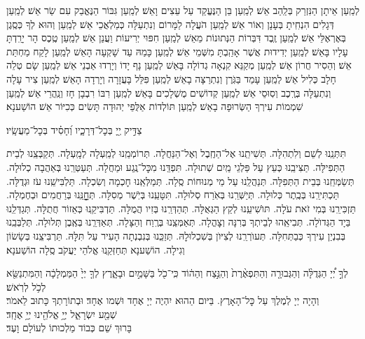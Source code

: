 \documentclass[twoside, openany, parskip=half, 11pt]{book}
\begin{document}
לְמַֽעַן אֵיתָן הַנִּזְרַק בְּלַֽהַב אֵשׁ׃ לְמַֽעַן בֵּן הַנֶּעֱקַד עַל עֵצִים וָאֵשׁ׃ לְמַֽעַן גִּבּוֹר הַנֶּאֱבַק עִם שַׂר אֵשׁ׃ לְמַֽעַן דְּגָלִים הִנְחִֽיתָ בְּעָנָן וְאוֹר אֵשׁ׃ לְמַֽעַן הֹעֲלָה לַמָּרוֹם וְנִתְעַלָּה כְּמַלְאֲכֵי אֵשׁ׃ לְמַֽעַן וְהוּא לְךָ כְּסֶֽגֶן בְּאֶרְאֶלֵּי אֵשׁ׃ לְמַֽעַן זֶֽבֶד דִּבְּרוֹת הַנְּתוּנוֹת מֵאֵשׁ לְמַֽעַן חִפּוּי יְרִיעוֹת וַעֲנַן אֵשׁ׃ לְמַֽעַן טֶֽכֶס הָר יָרַֽדְתָּ עָלָיו בָּאֵשׁ׃ לְמַֽעַן יְדִידוּת אֲשֶׁר אָהַֽבְתָּ מִשְּׁמֵי אֵשׁ׃ לְמַֽעַן כָּמַהּ עַד שָׁקְעָה הָאֵשׁ לְמַֽעַן לָקַח מַחְתַּת אֵשׁ׃ וְהֵסִיר חֲרוֹן אֵשׁ׃ לְמַֽעַן מְקַנֵּא קִנְאָה גְדוֹלָה בָּאֵשׁ לְמַֽעַן נָף יָדוֹ וְיָרְדוּ אַבְנֵי אֵשׁ׃ לְמַֽעַן שָׂם טְלֵה חָלָב כְּלִיל אֵשׁ׃ לְמַֽעַן עָמַד בַּגֹּֽרֶן וְנִתְרַצָּה בָאֵשׁ׃ לְמַֽעַן פִּלֵּל בָּעֲזָרָה וְיָרְדָה הָאֵשׁ׃ לְמַֽעַן צִיר עָלָה וְנִתְעַלָּה בְּרֶֽכֶב וְסֽוּסֵי אֵשׁ׃ לְמַֽעַן קְדוֹשִׁים מֻשְׁלָכִים בָּאֵשׁ׃ לְמַֽעַן רִבּוֹ רִבְבָן חָז וְנַֽהֲרֵי אֵשׁ׃
לְמַֽעַן שִׁמְמוֹת עִירְךָ הַשְּׂרוּפָה בָאֵשׁ׃
לְמַֽעַן תּוֹלְדוֹת אַלֻּפֵי יְהוּדָה תָּשִׂים כְּכִיּוֹר אֵשׁ׃ הוֹשַׁענָא׃

צַדִּ֣יק יְ֖יָ בְּכׇל־דְּרָכָ֑יו וְ֝חָסִ֗יד בְּכׇל־מַעֲשָֽׂיו׃

תִּתְּנֵֽנוּ לְשֵׁם וְלִתְהִלָּה.
תְּשִׁיתֵֽנוּ אֶל־הַחֶֽבֶל וְאֶל־הַנַּחֲלָה.
תְּרוֹמְמֵֽנוּ לְמַֽעְלָה לְמָֽעְלָה.
תְּקַבְּצֵֽנוּ לְבֵית הַתְּפִילָּה.
תַּצִּיבֵֽנוּ כְּעֵץ עַל פַּלְגֵי מַֽיִם שְׁתוּלָה.
תִּפְדֵּֽנוּ מִכׇּל־נֶֽגַע וּמַחֲלָה.
תְּעַטְּרֵֽנוּ בְּאַהֲבָה כְלוּלָה.
תְּשַׂמְּחֵֽנוּ בְּבֵית הַתְּפִלָּה.
תְּנַהֲלֵֽנוּ עַל מֵי מְנוּחוֹת סֶֽלָה.
תְּמַלְּאֵֽנוּ חׇכְמָה וְשִׂכְלָה.
תַּלְבִּישֵֽׁנוּ עֹז וּגְדֻלָּה.
תַּכְתִּירֵֽנוּ בְּכֶֽתֶר כְּלוּלָה.
תְּיַשְּׁרֵֽנוּ בְּאֹֽרַח סְלוּלָה.
תִּטָּעֵֽנוּ בְּיֹֽשֶׁר מְסִלָּה.
תְּחׇׇׇׇׇנֵּֽנוּ בְּרַחֲמִים וּבְחֶמְלָה.
תַּזְכִּירֵֽנוּ בְּמִי זֹאת עֹלָה.
תּוׂשִׁיעֵֽנוּ לְקֵץ הַגְּאֻלָּה.
תְּהַדְּרֵֽנוּ בְּזִיו הֲמֻלָּה.
תַּדְבִּיקֵֽנוּ כְּאֵזוֹר חֲתֻלָּה.
תְּגַדְּלֵֽנוּ בַּיָד הַגְּדוׂלָה.
תְּבִיאֵֽהוּ לְבֵיתְךָ בְּרִנָּה וְצׇהֳלָה.
תְּאַמְּצֵֽנוּ בְּרֶֽוַח וְהַצָּלָה.
תְּאַדְּרְֵנוּ בְּאֶֽבֶן תְּלוּלָה.
תְּלַבְּבֵֽנוּ בְּבִנְיַן עִירְךָ כְּבַתְּחִלָּה.
תְּעוׂרְרֵֽנוּ לְצִיּוׂן בְּשִׁכְלוּלׇהּ.
תְּזַכְֵּנוּ בְּנִבְנְתָה הָעִיר עַל תִּלׇּהּ.
תַּרְבִּיצֵֽנוּ בְּשָׂשׂוֹן וְגִילָה.
הוֹשַׁענָא תְּחַזְּקֵֽנוּ אֱלֹהֵי יַעֲקֹב סֶֽלָה הוֹשַׁענָא׃

לְךָ֣ יְ֠יָ הַגְּדֻלָּ֨ה וְהַגְּבוּרָ֤ה וְהַתִּפְאֶ֨רֶת֙ וְהַנֵּ֣צַח וְהַה֔וֹד
כִּֽי־כֹ֖ל בַּשָּׁמַ֣יִם וּבָאָ֑רֶץ לְךָ֤ יְיָ֙ הַמַּמְלָכָ֔ה
וְהַמִּתְנַשֵּׂ֖א לְכֹ֥ל לְרֹֽאשׁ׃\\
וְהָיָה יְיָ לְמֶלֶךְ עַל כׇּל־הָאָרֶץ. בַּיּום הַהוּא יִהְיֶה יְיָ אֶחָד וּשְׁמו אֶחָד׃ וּבְתוֹרָתְךָ כָּתוּב לֵאמֹר׃ \\
שְׁמַ֖ע יִשְׂרָאֵ֑ל יְיָ֥ אֱלֹהֵ֖ינוּ יְיָ֥ אֶחָֽד׃\\
בָּרוּךְ שֵׁם כְּבוֹד מַלְכוּתוֹ לְעוֹלָם וָעֶד׃
\end{document}
